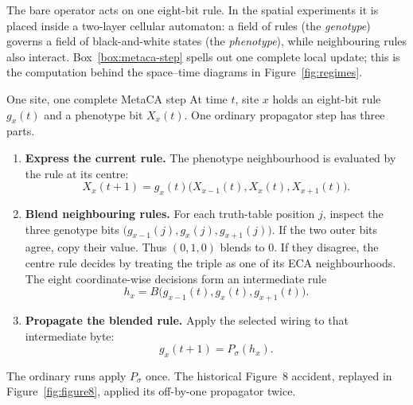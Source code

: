 \documentclass[man,12pt,floatsintext]{apa7}
\newcommand{\sig}{\sigma}
\begin{document}
The bare operator acts on one eight-bit rule. In the spatial experiments it
is placed inside a two-layer cellular automaton: a field of rules (the
\emph{genotype}) governs a field of black-and-white states (the
\emph{phenotype}), while neighbouring rules also interact. Box~\ref{box:metaca-step}
spells out one complete local update; this is the computation behind the
space--time diagrams in Figure~\ref{fig:regimes}.

\Needspace{0.72\textheight}
\begin{workedexample}[label={box:metaca-step}]{One site, one complete MetaCA step}
\small
At time $t$, site $x$ holds an eight-bit rule $g_x(t)$ and a phenotype bit
$X_x(t)$. One ordinary propagator step has three parts.
\begin{enumerate}
\item \textbf{Express the current rule.} The phenotype neighbourhood is
evaluated by the rule at its centre:
\[
X_x(t+1)=g_x(t)\bigl(X_{x-1}(t),X_x(t),X_{x+1}(t)\bigr).
\]
\item \textbf{Blend neighbouring rules.} For each truth-table position $j$,
inspect the three genotype bits
$\bigl(g_{x-1}(j),g_x(j),g_{x+1}(j)\bigr)$. If the two outer bits agree, copy
their value. Thus $(0,1,0)$ blends to $0$. If they disagree, the centre rule
decides by treating the triple as one of its ECA neighbourhoods. The eight
coordinate-wise decisions form an intermediate rule
\[
h_x=B\bigl(g_{x-1}(t),g_x(t),g_{x+1}(t)\bigr).
\]
\item \textbf{Propagate the blended rule.} Apply the selected wiring to that
intermediate byte:
\[
g_x(t+1)=P_\sig(h_x).
\]
\end{enumerate}
The ordinary runs apply $P_\sig$ once. The historical Figure~8 accident,
replayed in Figure~\ref{fig:figure8}, applied its off-by-one propagator twice.
\end{workedexample}
\end{document}
